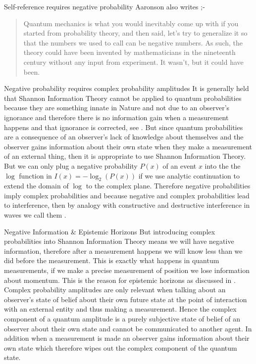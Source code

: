 \documentclass[final]{beamer}
\newlength{\colwidth}
\begin{document}
\begin{frame}[t]
\begin{columns}[t]
\begin{column}{\colwidth}
\begin{block}{Self-reference requires negative probability}
  Aaronson also writes \autocite{Aaronson:dem};-
  
  \begin{quote}
  Quantum mechanics is what you would inevitably come up with if you started from probability theory, and then said, let's try to generalize it so that the numbers we used to call  can be negative numbers. As such, the theory could have been invented by mathematicians in the nineteenth century without any input from experiment. It wasn't, but it could have been.\\
  \end{quote}
  \end{block}
\begin{block}{Negative probability requires complex probability amplitudes}
It is generally held that Shannon Information Theory cannot be applied to quantum probabilities because they are something innate in Nature and not due to an observer's ignorance and therefore there is no information gain when a measurement happens and that ignorance is corrected,  see \autocite{brukner_2000_shannon}. But since quantum probabilities are a consequence of an observer's lack of knowledge about themselves and the observer gains information about their own state when they make a measurement of an external thing, then it is appropriate to use Shannon Information Theory. But we can only plug a negative probability $P(x)$ of an event $x$ into the the $\log$ function in $I(x) = -\log_2(P(x))$ if we use analytic continuation to extend the domain of $\log$ to the complex plane. Therefore negative probabilities imply complex probabilities and because negative and complex probabilities lead to interference, then by analogy with constructive and destructive interference in waves we call them .
\end{block}
\begin{block}{Negative Information \& Epistemic Horizons}
But introducing complex probabilities into Shannon Information Theory means we will have negative information, therefore after a measurement happens we will know less than we did before the measurement. This is exactly what happens in quantum measurements, if we make a precise measurement of position we lose information about momentum. This is the reason for epistemic horizons as discussed in \autocite{szangolies_j_2018}. Complex probability amplitudes are only relevant when talking about an observer's state of belief about their own future state at the point of interaction with an external entity and thus making a measurement. Hence the complex component of a quantum amplitude is a purely subjective state of belief of an observer about their own state and cannot be communicated to another agent. In addition when a measurement is made an observer gains information about their own state which therefore wipes out the complex component of the quantum state. 
\end{block}
\end{column}


\end{columns}
\end{frame}
\end{document}
